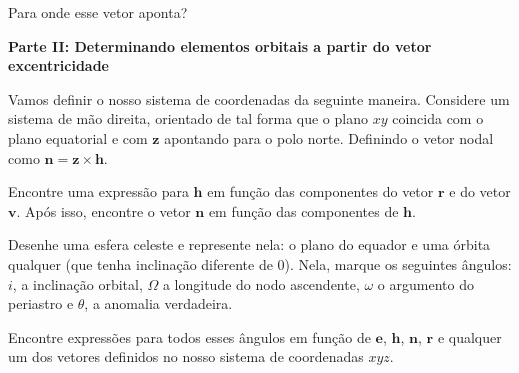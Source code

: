 \documentclass[11pt]{article}
\begin{document}
\begin{pproblem}
\begin{alternativas}
        Para onde esse vetor aponta?
    \end{alternativas}
    \begin{center}
        \textbf{Parte II: Determinando elementos orbitais a partir do vetor excentricidade}     
    \end{center}
    Vamos definir o nosso sistema de coordenadas da seguinte maneira. Considere um sistema de mão direita, orientado de tal forma que o plano \(xy\) coincida com o plano equatorial e com \(\mathbf{z}\) apontando para o polo norte. Definindo o vetor nodal como \(\mathbf{n} = \mathbf{z} \times \mathbf{h}\).
    \begin{alternativas}
        \item Encontre uma expressão para \(\mathbf{h}\) em função das componentes do vetor \(\mathbf{r}\) e do vetor \(\mathbf{v}\). Após isso, encontre o vetor \(\mathbf{n}\) em função das componentes de \(\mathbf{h}\).

        \item Desenhe uma esfera celeste e represente nela: o plano do equador e uma órbita qualquer (que tenha inclinação diferente de 0). Nela, marque os seguintes ângulos: \(i\), a inclinação orbital, \(\Omega\) a longitude do nodo ascendente, \(\omega\) o argumento do periastro e \(\theta\), a anomalia verdadeira. 

        \item Encontre expressões para todos esses ângulos em função de \(\mathbf{e}\), \(\mathbf{h}\), \(\mathbf{n}\), \(\mathbf{r}\) e qualquer um dos vetores definidos no nosso sistema de coordenadas \(xyz\).
    \end{alternativas}

   
\end{pproblem}
\end{document}
